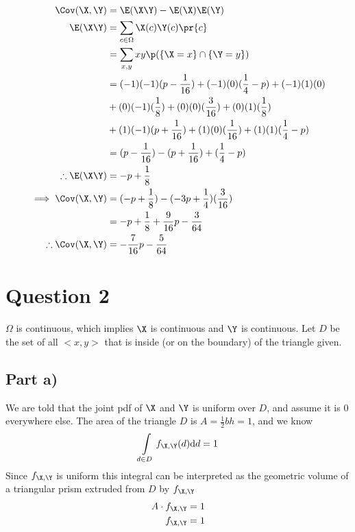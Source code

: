 \begin{align*}
\Cov(\X, \Y) &= \E(\X \Y) - \E(\X)\E(\Y) \\
\E(\X \Y) &= \sum _{c \in \Omega} \X(c)\Y(c)\pr{c} \\
&= \sum _{x,y} xy \p(\{ \X = x \} \cap \{ \Y = y \}) \\
&= (-1)(-1)(p - \frac{1}{16}) + (-1)(0)(\frac{1}{4} - p) + (-1)(1)(0) \\
&+ (0)(-1)(\frac{1}{8}) + (0)(0)(\frac{3}{16}) + (0)(1)(\frac{1}{8}) \\
&+ (1)(-1)(p + \frac{1}{16}) + (1)(0)(\frac{1}{16}) + (1)(1)(\frac{1}{4} - p) \\
&= (p - \frac{1}{16}) - (p + \frac{1}{16}) + (\frac{1}{4} - p) \\
\therefore \E(\X \Y) &= -p + \frac{1}{8} \\
\implies \Cov(\X, \Y) &= (-p + \frac{1}{8}) - (-3p + \frac{1}{4})(\frac{3}{16}) \\
&= -p + \frac{1}{8} + \frac{9}{16}p - \frac{3}{64} \\
\therefore \Cov(\X, \Y) &= -\frac{7}{16}p - \frac{5}{64}
\end{align*}

\newpage
\section{Question 2}

$\Omega$ is continuous, which implies $\X$ is continuous and $\Y$ is continuous.
Let $D$ be the set of all $<x, y>$ that is inside (or on the boundary) of the triangle given.

\subsection{Part a)}

We are told that the joint pdf of $\X$ and $\Y$ is uniform over $D$, and assume it is $0$ everywhere else.
The area of the triangle $D$ is $A = \frac{1}{2}bh = 1$, and we know
\[
\int \limits _{d\in D} f_{\X,\Y}(d) \mathrm{d}d = 1
\]
Since $f_{\X, \Y}$ is uniform this integral can be interpreted as the geometric volume of a triangular prism extruded
from $D$ by $f_{\X, \Y}$
\begin{align*}
A \cdot f_{\X, \Y} = 1 \\
f_{\X, \Y} = 1
\end{align*}
